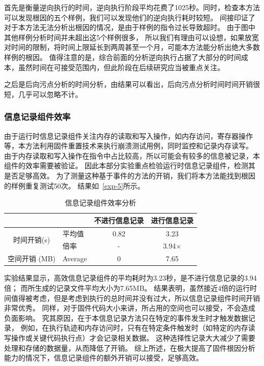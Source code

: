 首先是衡量逆向执行的时间，逆向执行阶段平均花费了1025秒。同时，检查本方法可以发现根因的五个样例，我们可以发现他们的逆向执行耗时较短。
间接印证了对于本方法无法分析出根因的情况，是由于样例的指令过长导致超时。
由于图中其他样例分析时间并未超出这5个样例很多，
所以我们有理由可以设想，如果放宽对时间的限制，将时间上限延长到两周甚至一个月，可能本方法能分析出绝大多数样例的根因。
值得注意的是，综合前面的分析逆向执行占据了大部分的时间成本，虽然时间在可接受范围内，但此阶段在后续研究应当被重点关注。

之后是后向污点分析的时间分析，由结果可以看出，后向污点分析时间时间开销很短，几乎可以忽略不计。


\subsubsection{信息记录组件效率}
由于运行时信息记录组件关注内存的读取和写入操作，如内存访问，寄存器操作等，本方法利用固件重置技术来执行崩溃测试用例，同时监控和记录内存读写。
由于内存读取和写入操作在指令中占比较高，所以可能会有较多的信息被记录，本组件的效率需要被验证。
因此本部分实验重点检验运行时信息记录组件，检测其是否足够高效。
为了测量这种基于事件的方法的开销，我们将本方法能找到根因的样例重复测试50次。
结果如~\autoref{exp-5}所示。
\begin{table}[ht]
    \centering
    \caption{信息记录组件效率分析}
    \begin{tabular}{@{}clcc@{}}
        \toprule
        \multicolumn{1}{l}{}      &            & 不进行信息记录 & 进行信息记录 \\ \midrule
        \multirow{2}{*}{时间开销(s)} & 平均值    & 0.82      & 3.23        \\ \cmidrule(l){2-4} 
                          & 倍率 &  -       & 3.94$\times{}$   \\ \midrule
        空间开销 (MB)                & Average    & 0         & 7.65        \\ \bottomrule
    \end{tabular}
    \label{exp-5}
\end{table}

实验结果显示，高效信息记录组件的平均耗时为3.23秒，是不进行信息记录的3.94倍；
而所生成的记录文件平均大小为7.65MB。
结果表明，虽然接近4倍的运行时间值得被考虑，但是考虑到执行的总时间并没有过大，所以信息记录组件时间开销非常优秀。
同样，对于固件代码大小来讲，所占用的空间也可以接受，不会造成负面影响。
究其原因，在于本信息记录方法只在特定的事件发生时才触发数据记录，
例如，在执行轨迹和内存访问时，只有在特定条件触发时（如特定的内存读写操作或关键代码执行点）才会记录相关数据。
这种选择性记录大大减少了需要处理和存储的数据量，从而降低了开销。
综上所述，在极大提高了固件根因分析能力的情况下，信息记录组件的额外开销可以接受，足够高效。
